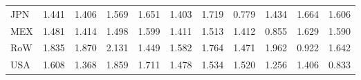 \begin{table}[htbp]
\begin{tabular}{lcccccccccc}
  JPN & \textcolor[RGB]{153,99,102}{1.441} & \textcolor[RGB]{173,112,82}{1.406} & \textcolor[RGB]{110,71,145}{1.569} & \textcolor[RGB]{77,50,178}{1.651} & \textcolor[RGB]{178,115,76}{1.403} & \textcolor[RGB]{59,38,196}{1.719} & \textcolor[RGB]{250,162,5}{0.779} & \textcolor[RGB]{158,102,97}{1.434} & \textcolor[RGB]{71,46,184}{1.664} & \textcolor[RGB]{94,61,161}{1.606} \\ 
  MEX & \textcolor[RGB]{143,92,112}{1.481} & \textcolor[RGB]{166,107,89}{1.414} & \textcolor[RGB]{135,87,120}{1.498} & \textcolor[RGB]{97,63,158}{1.599} & \textcolor[RGB]{171,111,84}{1.411} & \textcolor[RGB]{130,84,125}{1.513} & \textcolor[RGB]{168,109,87}{1.412} & \textcolor[RGB]{240,155,15}{0.855} & \textcolor[RGB]{84,54,171}{1.629} & \textcolor[RGB]{99,64,156}{1.590} \\ 
  RoW & \textcolor[RGB]{41,26,214}{1.835} & \textcolor[RGB]{31,20,224}{1.870} & \textcolor[RGB]{8,5,247}{2.131} & \textcolor[RGB]{150,97,105}{1.449} & \textcolor[RGB]{102,66,153}{1.582} & \textcolor[RGB]{46,30,209}{1.764} & \textcolor[RGB]{148,96,107}{1.471} & \textcolor[RGB]{20,13,235}{1.962} & \textcolor[RGB]{230,148,26}{0.922} & \textcolor[RGB]{82,53,173}{1.642} \\ 
  USA & \textcolor[RGB]{92,59,163}{1.608} & \textcolor[RGB]{191,124,64}{1.368} & \textcolor[RGB]{33,21,222}{1.859} & \textcolor[RGB]{64,41,191}{1.711} & \textcolor[RGB]{145,94,110}{1.478} & \textcolor[RGB]{122,79,133}{1.534} & \textcolor[RGB]{128,82,128}{1.520} & \textcolor[RGB]{207,134,48}{1.256} & \textcolor[RGB]{176,114,79}{1.406} & \textcolor[RGB]{245,158,10}{0.833} \\ 
   \hline
\end{tabular}
\end{table}
